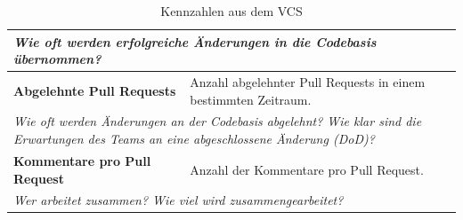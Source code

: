 \begin{table}[H]
\begin{tabular}{p{7cm}p{7.5cm}}
  \multicolumn{2}{p{14.5cm}}{\textit{Wie oft werden erfolgreiche Änderungen in die Codebasis übernommen?}} \\ \midrule
  \textbf{Abgelehnte Pull Requests} & Anzahl abgelehnter Pull Requests in einem bestimmten Zeitraum. \\ 
  \multicolumn{2}{p{14.5cm}}{\textit{Wie oft werden Änderungen an der Codebasis abgelehnt? \newline Wie klar sind die Erwartungen des Teams an eine abgeschlossene Änderung (\ac{DoD})?}} \\ \midrule
  \textbf{Kommentare pro Pull Request} & Anzahl der Kommentare pro Pull Request. \\ 
  \multicolumn{2}{p{14.5cm}}{\textit{Wer arbeitet zusammen? \newline Wie viel wird zusammengearbeitet?}} \\ \bottomrule
  \end{tabular}
  \caption{Kennzahlen aus dem \ac{VCS}}\label{metrics-table-vcs}
\end{table}

